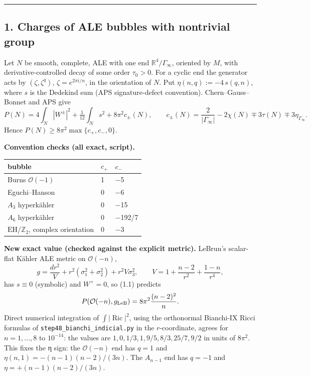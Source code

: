 \documentclass[
  10pt,
]{report}
\begin{document}
\begin{center}\rule{0.5\linewidth}{0.5pt}\end{center}

\hypertarget{charges-of-ale-bubbles-with-nontrivial-group}{%
\subsection{1. Charges of ALE bubbles with nontrivial
group}\label{charges-of-ale-bubbles-with-nontrivial-group}}

Let \(N\) be smooth, complete, ALE with one end
\(\mathbb R^4/\Gamma_\infty\), oriented by \(M\), with
derivative-controlled decay of some order \(\tau_0>0\). For a cyclic end
the generator acts by \((\zeta,\zeta^q)\), \(\zeta=e^{2\pi i/n}\), in
the orientation of \(N\). Put \(\eta(n,q):=-4\,s(q,n)\), where \(s\) is
the Dedekind sum (APS signature-defect convention). Chern--Gauss--Bonnet
and APS give \[
P(N)=4\!\int_N|W^\pm|^2+\tfrac1{12}\!\int_Ns^2+8\pi^2c_\pm(N),\qquad
c_\pm(N)=\frac{2}{|\Gamma_\infty|}-2\chi(N)\mp3\tau(N)\mp3\eta_{\Gamma_\infty}. \tag{1.1}
\] Hence \(P(N)\ge8\pi^2\max\{c_+,c_-,0\}\).

\textbf{Convention checks (all exact, script).}

\begin{longtable}[]{@{}lll@{}}
\toprule
bubble & \(c_+\) & \(c_-\)\tabularnewline
\midrule
\endhead
Burns \(\mathcal O(-1)\) & 1 & −5\tabularnewline
Eguchi--Hanson & 0 & −6\tabularnewline
\(A_3\) hyperkähler & 0 & −15\tabularnewline
\(A_6\) hyperkähler & 0 & −192/7\tabularnewline
\(\mathrm{EH}/\mathbb Z_2\), complex orientation & 0 & −3\tabularnewline
\bottomrule
\end{longtable}

\textbf{New exact value (checked against the explicit metric).} LeBrun's
scalar-flat Kähler ALE metric on \(\mathcal O(-n)\), \[
g=\frac{dr^2}{V}+r^2(\sigma_1^2+\sigma_2^2)+r^2V\sigma_3^2,\qquad V=1+\frac{n-2}{r^2}+\frac{1-n}{r^4},
\] has \(s\equiv0\) (symbolic) and \(W^+=0\), so (1.1) predicts \[
P(\mathcal O(-n),g_{\rm LeB})=8\pi^2\frac{(n-2)^2}{n}.
\] Direct numerical integration of \(\int|\operatorname{Ric}|^2\), using
the orthonormal Bianchi-IX Ricci formulas of
\texttt{step48\_bianchi\_indicial.py} in the \(r\)-coordinate, agrees
for \(n=1,\dots,8\) to \(10^{-14}\): the values are
\(1,0,1/3,1,9/5,8/3,25/7,9/2\) in units of \(8\pi^2\). This fixes the η
sign: the \(\mathcal O(-n)\) end has \(q=1\) and
\(\eta(n,1)=-(n-1)(n-2)/(3n)\). The \(A_{n-1}\) end has \(q=-1\) and
\(\eta=+(n-1)(n-2)/(3n)\).
\end{document}
